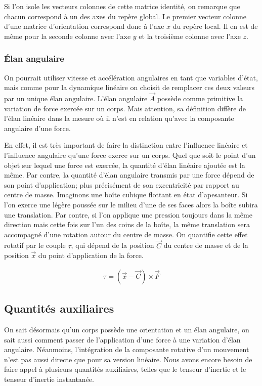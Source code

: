 Si l'on isole les vecteurs colonnes de cette matrice identité, on
remarque que chacun correspond à un des axes du repère global. Le
premier vecteur colonne d'une matrice d'orientation correspond donc à
l'axe $x$ du repère local. Il en est de même pour la seconde colonne
avec l'axe $y$ et la troisième colonne avec l'axe $z$.

\subsubsection{\'Elan angulaire}

On pourrait utiliser vitesse et accélération angulaires en tant que
variables d'état, mais comme pour la dynamique linéaire on choisit de
remplacer ces deux valeurs par un unique élan angulaire. L'élan
angulaire $\vec A$ possède comme primitive la variation de force
exercée sur un corps. Mais attention, sa définition diffère de l'élan
linéaire dans la mesure o\`u il n'est en relation qu'avec la
composante angulaire d'une force.

En effet, il est très important de faire la distinction entre
l'influence linéaire et l'influence angulaire qu'une force exerce sur
un corps. Quel que soit le point d'un objet sur lequel une force est
exercée, la quantité d'élan linéaire ajoutée est la même. Par contre,
la quantité d'élan angulaire transmis par une force dépend de son
point d'application; plus précisément de son excentricité par rapport
au centre de masse. Imaginons une boîte cubique flottant en état
d'apesanteur. Si l'on exerce une légère poussée sur le milieu d'une de
ses faces alors la boîte subira une translation. Par contre, si l'on
applique une pression toujours dans la même direction mais cette fois
sur l'un des coins de la boîte, la même translation sera accompagné
d'une rotation autour du centre de masse. On quantifie cette effet
rotatif par le couple $\tau$, qui dépend de la position $\vec C$ du
centre de masse et de la position $\vec x$ du point d'application de
la force.

\begin{align}
  \tau = (\vec{x} - \vec{C}) \times \vec{F}
\end{align}

\subsection{Quantités auxiliaires}

On sait désormais qu'un corps possède une orientation et un élan
angulaire, on sait aussi comment passer de l'application d'une force à
une variation d'élan angulaire. Néanmoins, l'intégration de la
composante rotative d'un mouvement n'est pas aussi directe que pour sa
version linéaire. Nous avons encore besoin de faire appel à plusieurs
quantités auxiliaires, telles que le tenseur d'inertie et le tenseur
d'inertie instantanée.

